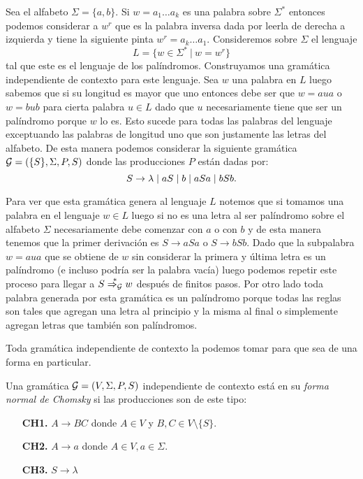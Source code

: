 \documentclass[tesis.tex]{subfiles}
\begin{document}
\begin{ej}\label{leng_ej_gram_palindromos}
	Sea el alfabeto $\Sigma = \{ a,b \}$. Si $w=a_1 \dots a_k$ es una palabra sobre $\Sigma^*$ entonces podemos considerar a $w^r$ que es la palabra inversa dada por leerla de derecha a izquierda y tiene la siguiente pinta $w^r= a_k \dots a_1$. 
	Consideremos sobre $\Sigma$ el lenguaje 
	\[
	L = \{ w \in \Sigma^* \ | \ w = w^r  \}
	\]
	tal que este es el lenguaje de los palíndromos. 
	Construyamos una gramática independiente de contexto para este lenguaje.
	Sea $w$ una palabra en $L$ luego sabemos que si su longitud es mayor que uno entonces debe ser que $w = a u a$ o $w = b u b$ para cierta palabra $u \in L$ dado que $u$ necesariamente tiene que ser un palíndromo porque $w$ lo es. 
	Esto sucede para todas las palabras del lenguaje exceptuando las palabras de longitud uno que son justamente las letras del alfabeto. 
	De esta manera podemos considerar la siguiente gramática ${\cal G}  =  (\{S\}, \Sigma, P, S )$ donde las producciones $P$ están dadas por:
	\begin{equation*}
		S  \to \lambda \\ \mid a \\ S  \mid  b \\ \mid aSa \\ \mid bSb. \\
	\end{equation*}

	Para ver que esta gramática genera al lenguaje $L$ notemos que si tomamos una palabra en el lenguaje $w \in L$ luego si no es una letra al ser palíndromo sobre el alfabeto $\Sigma$ necesariamente debe comenzar con $a$ o con $b$ y de esta manera tenemos que la primer derivación es $S \to aSa$ o $S \to bSb$. 
	Dado que la subpalabra $w = aua$ que se obtiene de $w$ sin considerar la primera y última letra es un palíndromo (e incluso podría ser la palabra vacía) luego podemos repetir este proceso para llegar a $S \overset{*}{\Rightarrow_{\cal G}} w$ después de finitos pasos. 
	Por otro lado toda palabra generada por esta gramática es un palíndromo porque todas las reglas son tales que agregan una letra al principio y la misma al final o simplemente agregan letras que también son palíndromos.
\end{ej}

Toda gramática independiente de contexto la podemos tomar para que sea de una forma en particular.

\begin{deff}
	Una gramática ${\cal G} = (V, \Sigma, P, S)$ independiente de contexto está en su \emph{forma normal de Chomsky} si las producciones son de este tipo:
	\begin{enumerate}
		\item[\textbf{CH1.}] $A \to BC$ donde $A\in V$ y $B,C \in V \setminus \{ S \}$.
		\item[\textbf{CH2.}] $A \to a$ donde $A \in V, a \in \Sigma$.
		\item[\textbf{CH3.}] $S \to \lambda$ 
	\end{enumerate}
\end{deff}
\end{document}

